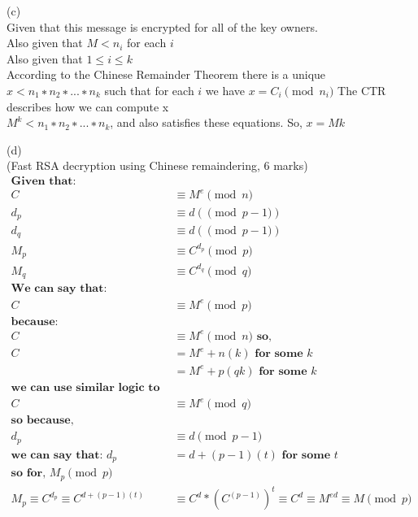 \documentclass{assignment}
\begin{document}
\begin{flushleft}
\begin{problemlist}
\begin{doublespace}
\end{doublespace}
\item[(c)]\hspace{1cm}\\
Given that this message is encrypted for all of the key owners.\\
Also given that  $M < n_i $ for each $i$\\
Also given that  $1 \leq i \leq k$\\
According to the Chinese Remainder Theorem there is a unique $x < n_1 ∗
n_2 ∗ ... ∗ n_k$ such that for each $i$ we have $x = C_i \pmod n_i$
The CTR describes how we can compute x\\
$M^k < n_1∗n_2∗...∗n_k$, and also satisfies these equations. So, $x = Mk$
\item[(d)]\hspace{1cm}\\
\newpage
\pbitem (Fast RSA decryption using Chinese remaindering, 6 marks)
\begin{align*}
\textbf{Given that: }\\
C &\equiv M^e \pmod{n}\\
d_p &\equiv d( \pmod{p-1})\\
d_q &\equiv d(\pmod{p-1})\\
M_p &\equiv C^{d_p} \pmod{p}\\
M_q & \equiv C^{d_q} \pmod{q}\\
\textbf{We can say that: }\\
 C &\equiv M^e \pmod{p}\\
\textbf{because: }\\
C &\equiv M^e \pmod{n} \textbf{ so, }\\
C &= M^e + n(k) \textbf{ for some } k\\ 
&= M^e + p(qk) \textbf{ for some } k\\
\textbf{we can use similar logic to say that: }\\
C &\equiv M^e \pmod{q}\\
\textbf{so because, }\\
d_p &\equiv d \pmod{p-1}\\
 \textbf{we can say that: } d_p &= d + (p-1)(t) \textbf{ for some } t\\
 \textbf{so for, } M_p \pmod{p}\\
 M_p \equiv C^{d_p} \equiv C^{d + (p-1)(t)} &\equiv C^d * (C^{(p-1)})^{t} \equiv C^d \equiv M^{ed} \equiv M \pmod{p}\\

\end{align*}
\end{problemlist}
\end{flushleft}
\end{document}
